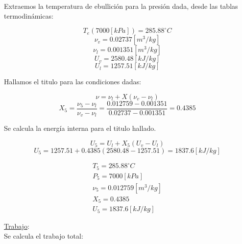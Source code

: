 \documentclass[letter,11pt]{article}
\begin{document}
\begin{enumerate}
Extraemos la temperatura de ebullición para la presión dada, desde las tablas
termodinámicas:

\begin{equation*}
    T_{e}(7000[kPa])=285.88^\circ C
\end{equation*}
\begin{equation*}
    \nu_v=0.02737[m^3/kg]
\end{equation*}
\begin{equation*}
    \nu_l=0.001351[m^3/kg]
\end{equation*}
\begin{equation*}
    U_v=2580.48[kJ/kg]
\end{equation*}
\begin{equation*}
    U_l=1257.51[kJ/kg]
\end{equation*}

Hallamos el titulo para las condiciones dadas:

\begin{equation*}
    \nu=\nu_l+X(\nu_v-\nu_l)
\end{equation*}
\begin{equation*}
    X_5=\frac{\nu_5-\nu_l}{\nu_v-\nu_l}
    =\frac{0.012759-0.001351}{0.02737-0.001351}
    =0.4385
\end{equation*}

Se calcula la energía interna para el titulo hallado.

\begin{equation*}
    U_5=U_l+X_5(U_v-U_l)
\end{equation*}
\begin{equation*}
    U_5=1257.51+0.4385(2580.48-1257.51)=1837.6[kJ/kg]
\end{equation*}

\begin{equation*}
\boxed{
    \begin{array}{l}
        T_5=285.88^\circ C \\
        P_5=7000[kPa] \\
        \nu_5=0.012759[m^3/kg] \\
        X_5=0.4385 \\
        U_5=1837.6[kJ/kg]
    \end{array}
}
\end{equation*}

\underline{Trabajo}:\\
Se calcula el trabajo total:


\end{enumerate}
\end{document}
